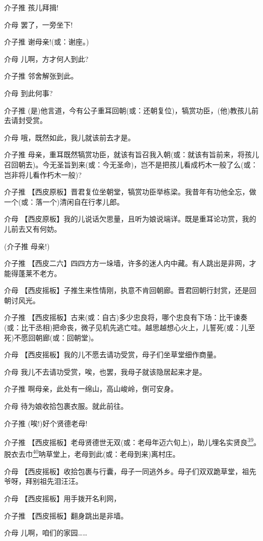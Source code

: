 介子推 孩儿拜揖!

介母 罢了，一旁坐下!

介子推 谢母亲!(或：谢座。)

介母 儿啊，方才何人到此?

介子推 邻舍解张到此。

介母 到此何事?

介子推
(是)他言道，今有公子重耳回朝(或：还朝复位)，犒赏功臣，(他)教孩儿前去请封受赏。

介母 哦，既然如此，我儿就该前去才是。

介子推
母亲，重耳既然犒赏功臣，就该有旨召我入朝(或：就该有旨前来，将孩儿召回朝去)。今无圣旨到来(或：今无圣命)，岂不是把孩儿看成朽木一般了么(或：岂非将儿看作朽木一般)?

介子推
【西皮原板】晋君复位坐朝堂，犒赏功臣举栋梁。我昔年有功他全忘，做一个(或：落一个)清闲自在行孝儿郎。

介母
【西皮原板】我的儿说话欠思量，且听为娘说端详。既是重耳论功赏，我的儿前去又有何妨。

(介子推 母亲!)

介子推
【西皮二六】四四方方一垛墙，许多的迷人内中藏。有人跳出是非网，才能得蓬莱不老方。

介母
【西皮摇板】子推生来性情刚，执意不肯回朝廊。晋君回朝行封赏，还是回朝讨风光。

介子推
【西皮摇板】古来(或：自古)多少忠良将，哪个忠良有下场：比干谏奏(或：比干丞相)把命丧，微子见机先逃亡哇。越思越想心火上，儿誓死(或：儿至死)不愿回朝廊(或：回朝堂)。

介母 【西皮摇板】我的儿不愿去请功受赏，母子们坐草堂细作商量。

介母 我儿不去请功受赏，唉，也罢，我母子就该隐居起来才是。

介子推 啊母亲，此处有一绵山，高山峻岭，倒可安身。

介母 待为娘收拾包裹衣服。就此前往。

介子推 (唉!)好个贤德老母!

介子推
【西皮摇板】老母贤德世无双(或：老母年迈六旬上)，助儿埋名实贤良\protect\hyperlink{fn39}{\textsuperscript{39}}。脱衣去巾\protect\hyperlink{fn40}{\textsuperscript{40}}呐草堂上，老母到此(或：老母到来)离村庄。

介母
【西皮摇板】收拾包裹与行囊，母子一同逃外乡。母子们双双跪草堂，祖先爷呀，拜别祖先泪汪汪。

介母 【西皮摇板】用手拨开名利网，

介子推 【西皮摇板】翻身跳出是非墙。

介母 儿啊，咱们的家园\ldots{}\ldots{}

